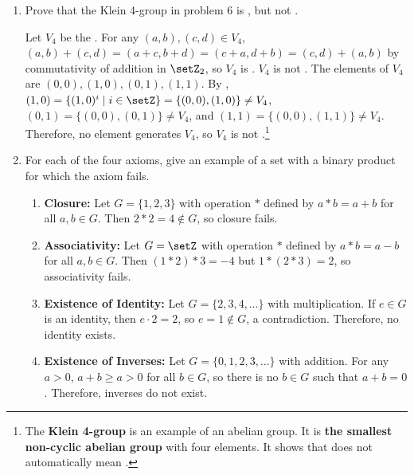 \begin{enumerate}
\begin{subprove}
    In additive notation, \([1]^{i} = i \cdot [1] = [i]\) for all \(i \in \setZ\), 
    so \(([1]) = \{[0], [1], [2], \ldots, [n-1]\} = \setZ_{n}\). 
    Therefore, \((\setZ_{n}, +) = ([1])\), 
    so \((\setZ_{n}, +)\) is cyclic with generator \([1]\).
  \end{subprove}
  \newpage
  \item Prove that the Klein 4-group in problem 6 is , but not .
  \begin{subprove}
    Let \(V_{4}\) be the . 
    For any \((a, b), (c, d) \in V_{4}\), 
    \((a, b) + (c, d) = (a + c, b + d) = (c + a, d + b) = (c, d) + (a, b)\) 
    by commutativity of addition in \(\setZ_{2}\), so \(V_{4}\) is .\proofstep
    \(V_{4}\) is not . 
    The elements of \(V_{4}\) are \((0, 0), (1, 0), (0, 1), (1, 1)\). 
    By , 
    \((1, 0) = \{(1, 0)^{i} \mid i \in \setZ\} = \{(0, 0), (1, 0)\} \neq V_{4}\), 
    \((0, 1) = \{(0, 0), (0, 1)\} \neq V_{4}\), and 
    \((1, 1) = \{(0, 0), (1, 1)\} \neq V_{4}\). 
    Therefore, no element generates \(V_{4}\), 
    so \(V_{4}\) is not .\footnote{
      The \textbf{Klein 4-group} is an example of an abelian group. 
      It is \textbf{the smallest non-cyclic abelian group} with four elements.
      It shows that  does not automatically mean .
    }
  \end{subprove}
  \item For each of the four  axioms, give an example of a set with a binary product for which the axiom fails.
  \begin{subprove}
    \begin{enumerate}
      \item \textbf{Closure:} Let \(G = \{1, 2, 3\}\) with operation \(*\) defined by \(a * b = a + b\) for all \(a, b \in G\). Then \(2 * 2 = 4 \notin G\), so closure fails.
      \item \textbf{Associativity:} Let \(G = \setZ\) with operation \(*\) defined by \(a * b = a - b\) for all \(a, b \in G\). Then \((1 * 2) * 3 = -4\) but \(1 * (2 * 3) = 2\), so associativity fails.
      \item \textbf{Existence of Identity:} Let \(G = \{2, 3, 4, \ldots\}\) with multiplication. If \(e \in G\) is an identity, then \(e \cdot 2 = 2\), so \(e = 1 \notin G\), a contradiction. Therefore, no identity exists.
      \item \textbf{Existence of Inverses:} Let \(G = \{0, 1, 2, 3, \ldots\}\) with addition. For any \(a > 0\), \(a + b \geq a > 0\) for all \(b \in G\), so there is no \(b \in G\) such that \(a + b = 0\). Therefore, inverses do not exist.

\end{enumerate}
\end{subprove}
\end{enumerate}
